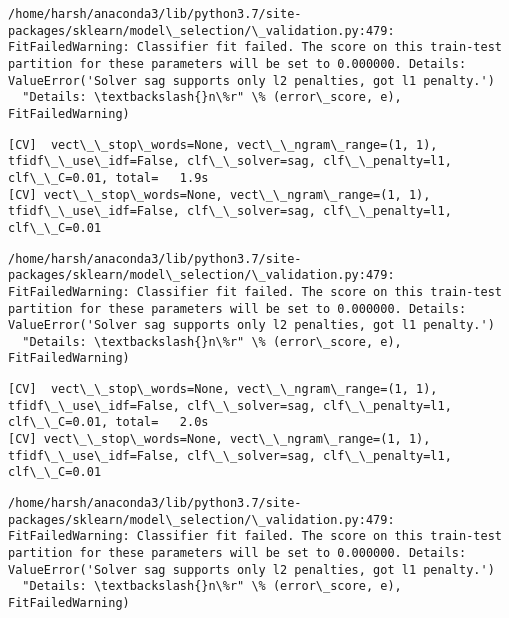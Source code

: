 \documentclass[11pt]{article}
\begin{document}
    \begin{Verbatim}[commandchars=\\\{\}]
/home/harsh/anaconda3/lib/python3.7/site-packages/sklearn/model\_selection/\_validation.py:479: FitFailedWarning: Classifier fit failed. The score on this train-test partition for these parameters will be set to 0.000000. Details: 
ValueError('Solver sag supports only l2 penalties, got l1 penalty.')
  "Details: \textbackslash{}n\%r" \% (error\_score, e), FitFailedWarning)

    \end{Verbatim}

    \begin{Verbatim}[commandchars=\\\{\}]
[CV]  vect\_\_stop\_words=None, vect\_\_ngram\_range=(1, 1), tfidf\_\_use\_idf=False, clf\_\_solver=sag, clf\_\_penalty=l1, clf\_\_C=0.01, total=   1.9s
[CV] vect\_\_stop\_words=None, vect\_\_ngram\_range=(1, 1), tfidf\_\_use\_idf=False, clf\_\_solver=sag, clf\_\_penalty=l1, clf\_\_C=0.01 

    \end{Verbatim}

    \begin{Verbatim}[commandchars=\\\{\}]
/home/harsh/anaconda3/lib/python3.7/site-packages/sklearn/model\_selection/\_validation.py:479: FitFailedWarning: Classifier fit failed. The score on this train-test partition for these parameters will be set to 0.000000. Details: 
ValueError('Solver sag supports only l2 penalties, got l1 penalty.')
  "Details: \textbackslash{}n\%r" \% (error\_score, e), FitFailedWarning)

    \end{Verbatim}

    \begin{Verbatim}[commandchars=\\\{\}]
[CV]  vect\_\_stop\_words=None, vect\_\_ngram\_range=(1, 1), tfidf\_\_use\_idf=False, clf\_\_solver=sag, clf\_\_penalty=l1, clf\_\_C=0.01, total=   2.0s
[CV] vect\_\_stop\_words=None, vect\_\_ngram\_range=(1, 1), tfidf\_\_use\_idf=False, clf\_\_solver=sag, clf\_\_penalty=l1, clf\_\_C=0.01 

    \end{Verbatim}

    \begin{Verbatim}[commandchars=\\\{\}]
/home/harsh/anaconda3/lib/python3.7/site-packages/sklearn/model\_selection/\_validation.py:479: FitFailedWarning: Classifier fit failed. The score on this train-test partition for these parameters will be set to 0.000000. Details: 
ValueError('Solver sag supports only l2 penalties, got l1 penalty.')
  "Details: \textbackslash{}n\%r" \% (error\_score, e), FitFailedWarning)

    \end{Verbatim}
\end{document}
